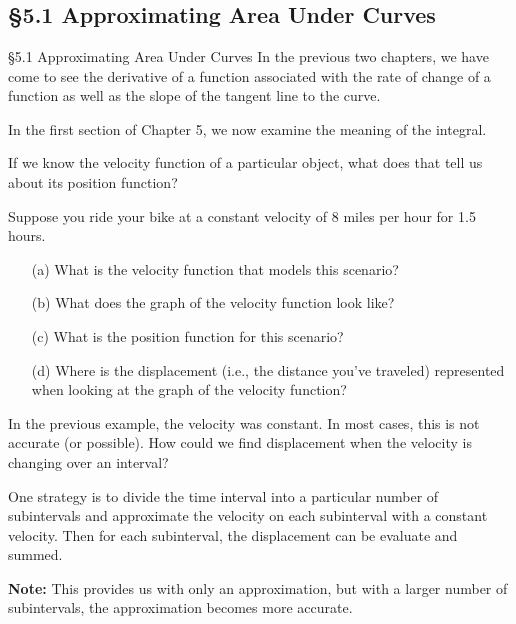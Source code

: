 \documentclass[cal1spr16Lectures.tex]{subfiles}
\begin{document}
\section[]{}

\subsection[5.1 Approximating Area Under Curves]{\S 5.1 Approximating Area Under Curves}

\begin{frame}{\S 5.1 Approximating Area Under Curves}\small
In the previous two chapters, we have come to see the derivative of a function associated with the rate of change of a function as well as the slope of the tangent line to the curve.
\vspace{1pc}

In the first section of Chapter 5, we now examine the meaning of the integral.
\begin{que}
If we know the velocity function of a particular object, what does that tell us about its position function?
\end{que}
\end{frame}

\begin{frame}\small
\begin{ex} 
Suppose you ride your bike at a constant velocity of 8 miles per hour for 1.5 hours.
\begin{itemize}
\item[(a)] What is the velocity function that models this scenario?
\item[(b)] What does the graph of the velocity function look like?
\item[(c)] What is the position function for this scenario?
\item[(d)] Where is the displacement (i.e., the distance you've traveled) represented when looking at the graph of the velocity function?
\end{itemize}
\end{ex}
\end{frame}

\begin{frame}\small
In the previous example, the velocity was constant.  In most cases, this is not accurate (or possible).  How could we find displacement when the velocity is changing over an interval?
\vspace{1pc}

One strategy is to divide the time interval into a particular number of subintervals and approximate the velocity on each subinterval with a constant velocity.  Then for each subinterval, the displacement can be evaluate and summed.
\vspace{1pc}

{\bf Note:}  This provides us with only an approximation, but with a larger number of subintervals, the approximation becomes more accurate.
\end{frame}
\end{document}
